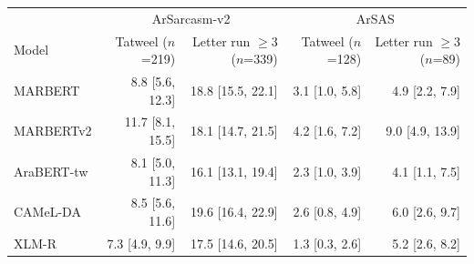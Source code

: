 \begin{tabular}{lrrrr}
\toprule
 & \multicolumn{2}{c}{ArSarcasm-v2} & \multicolumn{2}{c}{ArSAS} \\
Model & Tatweel {\scriptsize($n$=219)} & Letter run $\geq$3 {\scriptsize($n$=339)} & Tatweel {\scriptsize($n$=128)} & Letter run $\geq$3 {\scriptsize($n$=89)} \\
\midrule
MARBERT & 8.8 {\scriptsize[5.6, 12.3]} & 18.8 {\scriptsize[15.5, 22.1]} & 3.1 {\scriptsize[1.0, 5.8]} & 4.9 {\scriptsize[2.2, 7.9]} \\
MARBERTv2 & 11.7 {\scriptsize[8.1, 15.5]} & 18.1 {\scriptsize[14.7, 21.5]} & 4.2 {\scriptsize[1.6, 7.2]} & 9.0 {\scriptsize[4.9, 13.9]} \\
AraBERT-tw & 8.1 {\scriptsize[5.0, 11.3]} & 16.1 {\scriptsize[13.1, 19.4]} & 2.3 {\scriptsize[1.0, 3.9]} & 4.1 {\scriptsize[1.1, 7.5]} \\
CAMeL-DA & 8.5 {\scriptsize[5.6, 11.6]} & 19.6 {\scriptsize[16.4, 22.9]} & 2.6 {\scriptsize[0.8, 4.9]} & 6.0 {\scriptsize[2.6, 9.7]} \\
XLM-R & 7.3 {\scriptsize[4.9, 9.9]} & 17.5 {\scriptsize[14.6, 20.5]} & 1.3 {\scriptsize[0.3, 2.6]} & 5.2 {\scriptsize[2.6, 8.2]} \\
\bottomrule
\end{tabular}

